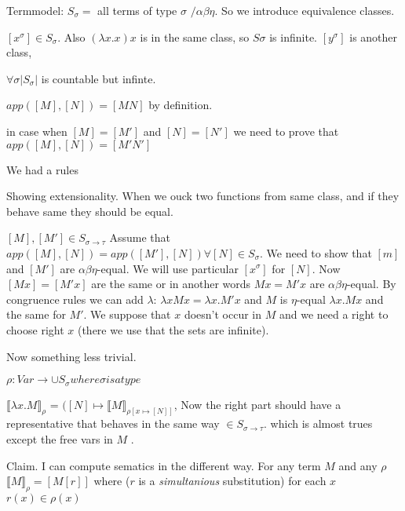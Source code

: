 \documentclass[a4paper,10pt]{book}
\newcommand{\sem}[2]{ \llbracket#1\rrbracket_{#2} }
\begin{document}
Termmodel: $S_\sigma = $ all terms of type $\sigma$ $ / \alpha\beta\eta$. So we introduce equivalence classes.

$[x^\sigma] \in S_\sigma$. Also $(\lambda x .x) x$ is in the same class, so $S\sigma$ is infinite. 
$[y^\sigma]$ is another class,


$\forall \sigma |S_\sigma| $ is countable but infinte.

$app([M],[N]) = [MN]$ by definition.

in case when $[M]=[M']$ and $[N]=[N']$ we need to prove that $app([M],[N]) = [M'N']$

We had a rules
\begin{prooftree}
\end{prooftree}



Showing extensionality.  When we ouck two functions from same class, and if they behave same
they should be equal.

$[M], [M'] \in S_{\sigma \rightarrow \tau}$
Assume that $app([M],[N]) = app([M'],[N]) \forall [N]\in S_{\sigma}$. We need to show that $[m]$ and $[M']$ 
are $\alpha\beta\eta$-equal. We will use particular $[x^\sigma]$ for $[N]$. 
Now $[Mx] = [M'x]$ are the same or
in another words $Mx = M'x$ are $\alpha\beta\eta$-equal. By congruence rules we can add $\lambda$: 
$\lambda x M x = \lambda x . M' x$ 
and $M$ is $\eta$-equal $\lambda x . M x$ 
and the same for $M'$. We suppose that 
$x$ doesn't occur in $M$ and we need a right to choose right $x$ (there we use that the sets are infinite).

Now something less trivial.

$\rho: Var \rightarrow \cup S_\sigma where \sigma is a type$


$\sem{\lambda x . M}{\rho}$ = $([N] \mapsto \sem{M}{\rho[x \mapsto [N]]}$, Now the right part should 
have a representative that behaves in the same way $\in S_{\sigma \rightarrow \tau}$. which is almost trues except the free vars in $M$
.

Claim. I can compute sematics in the different way. For any term $M$ and any $\rho$
$\sem{M}{\rho} = [M[r]]$ where ($r$ is a \textit{simultanious} substitution)
for each $x$ $r(x) \in \rho(x)$
\end{document}
